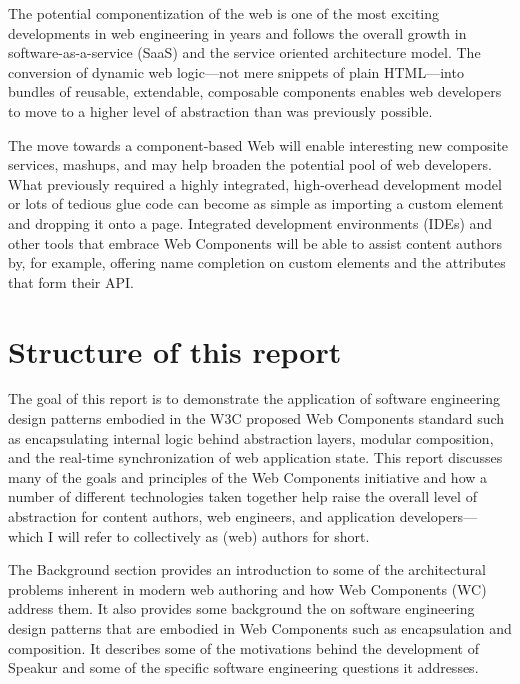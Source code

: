The potential componentization of the web is one of the most exciting developments in web engineering in years and follows the overall growth in software-as-a-service (SaaS) 
and the service oriented architecture
model. 
The conversion of dynamic web logic---not mere snippets of plain HTML---into bundles of reusable, extendable, composable components enables web developers to move to a higher level of abstraction than was previously possible.

The move towards a component-based Web will enable interesting new composite services, mashups, and may help broaden the potential pool of web developers. 
What previously required a highly integrated, high-overhead development model or lots of tedious glue code can become as simple as importing a custom element and dropping it onto a page.
Integrated development environments (IDEs) and other tools that embrace Web Components will be able to assist content authors by, for example, offering name completion on custom elements and the attributes that form their API.

\section{Structure of this report}
%

The goal of this report is to demonstrate the application of 
software engineering 
design patterns embodied in the W3C proposed Web Components standard such as 
encapsulating internal logic 
behind abstraction layers, 
modular composition, 
and the real-time synchronization of web application state. 
This report discusses many of the goals and principles of the Web Components initiative and how a number of different technologies taken together help raise the overall level of 
abstraction for content authors, web engineers, and application developers---which I will refer to collectively as (web) authors for short.

The Background section provides an introduction to some of the architectural problems inherent in modern web authoring and how Web Components (WC) address them. 
It also provides some background the on software engineering design patterns that are embodied in Web Components such as encapsulation and composition.
It describes some of the motivations behind the development of Speakur and some of the specific software engineering questions it addresses.

